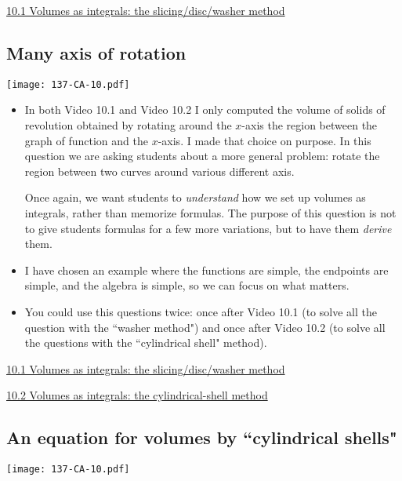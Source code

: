 \documentclass[11pt]{article}
\newcommand{\nl}{\hfill \vspace{-1.1\baselineskip}} %
\newcommand{\vi}{\hspace{8mm}\href{https://www.youtube.com/watch?v=Kq9Q5LISo5o&list=PLlwePzQY_wW9f22c89JAQBzaa-9XgESA8}{10.1 Volumes as integrals: the slicing/disc/washer method}}
\newcommand{\vii}{\hspace{8mm}\href{https://www.youtube.com/watch?v=YYM9URJ4iJ8&list=PLlwePzQY_wW9f22c89JAQBzaa-9XgESA8&index=2}{10.2 Volumes as integrals: the cylindrical-shell method}}
\begin{document}
\begin{videos}
\vi
\end{videos}

\newpage
\subsection{Many axis of rotation}

\begin{center}
{ \texttt{[image: 137-CA-10.pdf]}} 
\end{center}

\begin{comments}
\nl
	\begin{itemize}
		\item  In both Video 10.1 and Video 10.2 I only computed the volume of solids of revolution obtained by rotating around the $x$-axis the region between the graph of function and the $x$-axis.  I made that choice on purpose.  In this question we are asking students about a more general problem: rotate the region between two curves around various different axis.  
		
		Once again, we want students to \emph{understand} how we set up volumes as integrals, rather than memorize formulas.  The purpose of this question is not to give students formulas for a few more variations, but to have them \emph{derive} them.
		\item I have chosen an example where the functions are simple, the endpoints are simple, and the algebra is simple, so we can focus on what matters.
		\item  You could use this questions twice: once after Video 10.1 (to solve all the question with the ``washer method") and once after Video 10.2 (to solve all the questions with the ``cylindrical shell" method).
	\end{itemize}
\end{comments}

\begin{videos}
\vi

\vii
\end{videos}

\newpage
\subsection{An equation for volumes by ``cylindrical shells"}

\begin{center}
{ \texttt{[image: 137-CA-10.pdf]}} 
\end{center}
\end{document}
